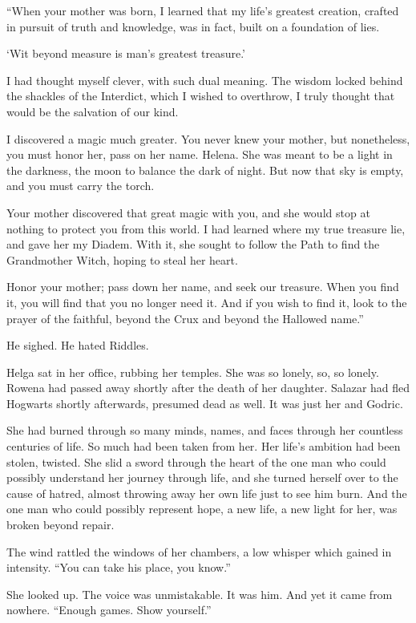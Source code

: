 “When your mother was born, I learned that my life’s greatest creation, crafted in pursuit of truth and knowledge, was in fact, built on a foundation of lies.

‘Wit beyond measure is man’s greatest treasure.’

I had thought myself clever, with such dual meaning. The wisdom locked behind the shackles of the Interdict, which I wished to overthrow, I truly thought that would be the salvation of our kind.

I discovered a magic much greater. You never knew your mother, but nonetheless, you must honor her, pass on her name. Helena. She was meant to be a light in the darkness, the moon to balance the dark of night. But now that sky is empty, and you must carry the torch.

Your mother discovered that great magic with you, and she would stop at nothing to protect you from this world. I had learned where my true treasure lie, and gave her my Diadem. With it, she sought to follow the Path to find the Grandmother Witch, hoping to steal her heart.

Honor your mother; pass down her name, and seek our treasure. When you find it, you will find that you no longer need it. And if you wish to find it, look to the prayer of the faithful, beyond the Crux and beyond the Hallowed name.”

He sighed. He hated Riddles.
\simpleline
{}

Helga sat in her office, rubbing her temples. She was so lonely, so, so lonely. Rowena had passed away shortly after the death of her daughter. Salazar had fled Hogwarts shortly afterwards, presumed dead as well. It was just her and Godric.

She had burned through so many minds, names, and faces through her countless centuries of life. So much had been taken from her. Her life’s ambition had been stolen, twisted. She slid a sword through the heart of the one man who could possibly understand her journey through life, and she turned herself over to the cause of hatred, almost throwing away her own life just to see him burn. And the one man who could possibly represent hope, a new life, a new light for her, was broken beyond repair.

The wind rattled the windows of her chambers, a low whisper which gained in intensity. “You can take his place, you know.”

She looked up. The voice was unmistakable. It was him. And yet it came from nowhere. “Enough games. Show yourself.”

